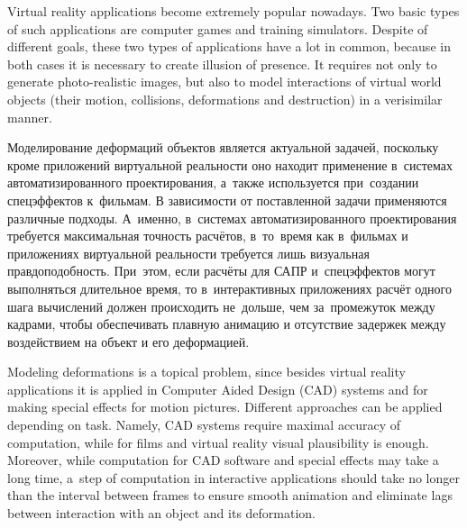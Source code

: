 \documentclass[a4paper, 12pt, titlepage]{extarticle}
\begin{document}
    Virtual reality applications become extremely popular nowadays. Two basic types of such
    applications are computer games and training simulators. Despite of different goals, these two
    types of applications have a lot in common, because in both cases it is necessary to create
    illusion of presence. It requires not only to generate photo-realistic images, but also to model
    interactions of virtual world objects (their motion, collisions, deformations and destruction)
    in a verisimilar manner.

\begin{original}
    Моделирование деформаций объектов является актуальной задачей, поскольку кроме приложений
    виртуальной реальности оно находит применение в~системах автоматизированного проектирования, а~также используется
    при~создании спецэффектов к~фильмам. В зависимости от поставленной задачи применяются различные
    подходы. А~именно, в~системах автоматизированного проектирования требуется
    максимальная точность расчётов, в~то~время как в~фильмах и приложениях виртуальной реальности
    требуется лишь визуальная правдоподобность. При~этом, если расчёты для САПР и~спецэффектов могут
    выполняться длительное время, то в~интерактивных приложениях расчёт одного шага вычислений должен
    происходить не~дольше, чем за~промежуток между кадрами, чтобы обеспечивать плавную анимацию
    и отсутствие задержек между воздействием на объект и его деформацией.
\end{original}

    Modeling deformations is a topical problem, since besides virtual reality applications it is
    applied in Computer Aided Design (CAD) systems and for making special effects for motion
    pictures.  Different approaches can be applied depending on task. Namely, CAD systems require
    maximal accuracy of computation, while for films and virtual reality visual plausibility is
    enough. Moreover, while computation for CAD software and special effects may take a long time,
    a~step of computation in interactive applications should take no longer than the interval
    between frames to ensure smooth animation and eliminate lags between interaction with an object
    and its deformation.
\end{document}
